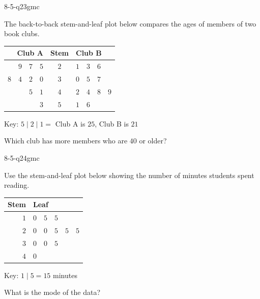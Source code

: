 \begin{practiceQuestion}{8-5-q23}{gmc}
\begin{questionText}
The back-to-back stem-and-leaf plot below compares the ages of members of two book clubs.

\begin{center}
\begin{tabular}{r c l}
\textbf{Club A} & \textbf{Stem} & \textbf{Club B} \\
\hline
$9 \quad 7 \quad 5$ & $2$ & $1 \quad 3 \quad 6$ \\
$8 \quad 4 \quad 2 \quad 0$ & $3$ & $0 \quad 5 \quad 7$ \\
$5 \quad 1$ & $4$ & $2 \quad 4 \quad 8 \quad 9$ \\
$3$ & $5$ & $1 \quad 6$ \\
\end{tabular}
\end{center}

Key: $5 \mid 2 \mid 1 = $ Club A is $25$, Club B is $21$

Which club has more members who are $40$ or older?
\end{questionText}
\end{practiceQuestion}

\begin{practiceQuestion}{8-5-q24}{gmc}
\begin{questionText}
Use the stem-and-leaf plot below showing the number of minutes students spent reading.

\begin{center}
\begin{tabular}{r|l}
\textbf{Stem} & \textbf{Leaf} \\
\hline
$1$ & $0 \quad 5 \quad 5$ \\
$2$ & $0 \quad 0 \quad 5 \quad 5 \quad 5$ \\
$3$ & $0 \quad 0 \quad 5$ \\
$4$ & $0$ \\
\end{tabular}
\end{center}

Key: $1 \mid 5 = 15$ minutes

What is the mode of the data?
\end{questionText}
\end{practiceQuestion}

